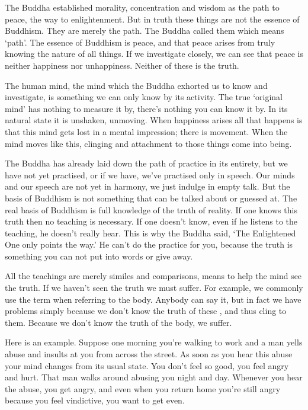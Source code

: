 The Buddha established morality, concentration and wisdom as the path to peace, the way to enlightenment. But in truth these things are not the essence of Buddhism. They are merely the path. The Buddha called them  which means `path'. The essence of Buddhism is peace, and that peace arises from truly knowing the nature of all things. If we investigate closely, we can see that peace is neither happiness nor unhappiness. Neither of these is the truth. 

The human mind, the mind which the Buddha exhorted us to know and investigate, is something we can only know by its activity. The true `original mind' has nothing to measure it by, there's nothing you can know it by. In its natural state it is unshaken, unmoving. When happiness arises all that happens is that this mind gets lost in a mental impression; there is movement. When the mind moves like this, clinging and attachment to those things come into being. 

The Buddha has already laid down the path of practice in its entirety, but we have not yet practised, or if we have, we've practised only in speech. Our minds and our speech are not yet in harmony, we just indulge in empty talk. But the basis of Buddhism is not something that can be talked about or guessed at. The real basis of Buddhism is full knowledge of the truth of reality. If one knows this truth then no teaching is necessary. If one doesn't know, even if he listens to the teaching, he doesn't really hear. This is why the Buddha said, `The Enlightened One only points the way.' He can't do the practice for you, because the truth is something you can not put into words or give away. 

All the teachings are merely similes and comparisons, means to help the mind see the truth. If we haven't seen the truth we must suffer. For example, we commonly use the term  when referring to the body. Anybody can say it, but in fact we have problems simply because we don't know the truth of these , and thus cling to them. Because we don't know the truth of the body, we suffer. 

Here is an example. Suppose one morning you're walking to work and a man yells abuse and insults at you from across the street. As soon as you hear this abuse your mind changes from its usual state. You don't feel so good, you feel angry and hurt. That man walks around abusing you night and day. Whenever you hear the abuse, you get angry, and even when you return home you're still angry because you feel vindictive, you want to get even. 

